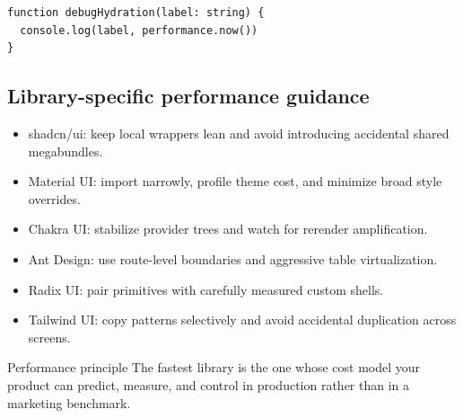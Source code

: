 \begin{verbatim}
function debugHydration(label: string) {
  console.log(label, performance.now())
}
\end{verbatim}

\subsection{Library-specific performance guidance}
\begin{itemize}[leftmargin=*, itemsep=0.35em]
  \item shadcn/ui: keep local wrappers lean and avoid introducing accidental shared megabundles.
  \item Material UI: import narrowly, profile theme cost, and minimize broad style overrides.
  \item Chakra UI: stabilize provider trees and watch for rerender amplification.
  \item Ant Design: use route-level boundaries and aggressive table virtualization.
  \item Radix UI: pair primitives with carefully measured custom shells.
  \item Tailwind UI: copy patterns selectively and avoid accidental duplication across screens.
\end{itemize}

\begin{highlightbox}{Performance principle}
The fastest library is the one whose cost model your product can predict, measure, and control in production rather than in a marketing benchmark.
\end{highlightbox}

